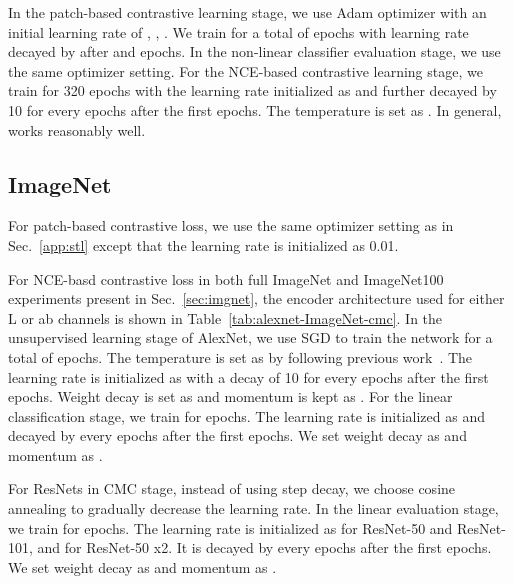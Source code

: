 \documentclass[10pt,twocolumn,letterpaper]{article}
\newcommand{\citep}[1]{\cite{#1}}
\begin{document}
In the patch-based contrastive learning stage, we use Adam optimizer with an initial learning rate of , , . We train for a total of  epochs with learning rate decayed by  after  and  epochs. In the non-linear classifier evaluation stage, we use the same optimizer setting. For the NCE-based contrastive learning stage, we train for 320 epochs with the learning rate initialized as  and further decayed by 10 for every  epochs after the first  epochs. The temperature  is set as . In general,  works reasonably well.

\subsection{ImageNet} \label{app:imagenet}
For patch-based contrastive loss, we use the same optimizer setting as in Sec.~\ref{app:stl} except that the learning rate is initialized as 0.01.

For NCE-basd contrastive loss in both full ImageNet and ImageNet100 experiments present in Sec.~\ref{sec:imgnet}, the encoder architecture used for either L or ab channels
is shown in Table~\ref{tab:alexnet-ImageNet-cmc}. In the unsupervised learning stage of AlexNet, we use SGD to train the network for a total of  epochs. The temperature  is set as  by following previous work~\citep{wu2018unsupervised}. The learning rate is initialized as  with a decay of 10 for every  epochs after the first  epochs. Weight decay is set as  and momentum is kept as . For the linear classification stage, we train for  epochs. The learning rate is initialized as  and decayed by  every  epochs after the first  epochs. We set weight decay as  and momentum as . 

For ResNets in CMC stage, instead of using step decay, we choose cosine annealing to gradually decrease the learning rate. In the linear evaluation stage, we train for  epochs. The learning rate is initialized as  for ResNet-50 and ResNet-101, and  for ResNet-50 x2. It is decayed by  every  epochs after the first  epochs. We set weight decay as  and momentum as .
\end{document}
